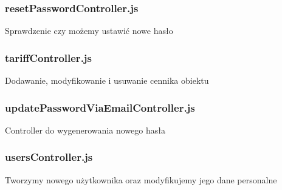 \documentclass[titlepage]{article}
\begin{document}
\subsubsection{resetPasswordController.js}
Sprawdzenie czy możemy ustawić nowe hasło

\subsubsection{tariffController.js}
Dodawanie, modyfikowanie i usuwanie cennika obiektu

\subsubsection{updatePasswordViaEmailController.js}
Controller do wygenerowania nowego hasła

\subsubsection{usersController.js}
Tworzymy nowego użytkownika oraz modyfikujemy jego dane personalne
\end{document}
